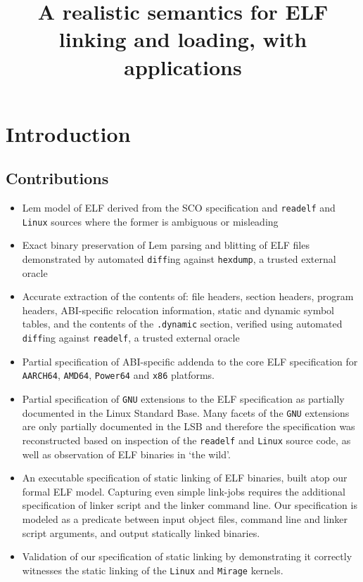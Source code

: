 \documentclass[preprint, natbib, 10pt]{sigplanconf-pldi15}
\title{A realistic semantics for ELF linking and loading, with applications}
\begin{document}
\maketitle

\begin{abstract}
\end{abstract}

\section{Introduction}
\label{sect.introduction}

\subsection{Contributions}
\label{subsect.contributions}

\begin{itemize}
\item
Lem model of ELF derived from the SCO specification and \texttt{readelf} and \texttt{Linux} sources where the former is ambiguous or misleading
\item
Exact binary preservation of Lem parsing and blitting of ELF files demonstrated by automated \texttt{diff}ing against \texttt{hexdump}, a trusted external oracle
\item
Accurate extraction of the contents of: file headers, section headers, program headers, ABI-specific relocation information, static and dynamic symbol tables, and the contents of the \texttt{.dynamic} section, verified using automated \texttt{diff}ing against \texttt{readelf}, a trusted external oracle
\item
Partial specification of ABI-specific addenda to the core ELF specification for \texttt{AARCH64}, \texttt{AMD64}, \texttt{Power64} and \texttt{x86} platforms.
\item
Partial specification of \texttt{GNU} extensions to the ELF specification as partially documented in the Linux Standard Base.
Many facets of the \texttt{GNU} extensions are only partially documented in the LSB and therefore the specification was reconstructed based on inspection of the \texttt{readelf} and \texttt{Linux} source code, as well as observation of ELF binaries in `the wild'.
\item
An executable specification of static linking of ELF binaries, built atop our formal ELF model.
Capturing even simple link-jobs requires the additional specification of linker script and the linker command line.
Our specification is modeled as a predicate between input object files, command line and linker script arguments, and output statically linked binaries.
\item
Validation of our specification of static linking by demonstrating it correctly witnesses the static linking of the \texttt{Linux} and \texttt{Mirage} kernels.
\end{itemize}
\end{document}
